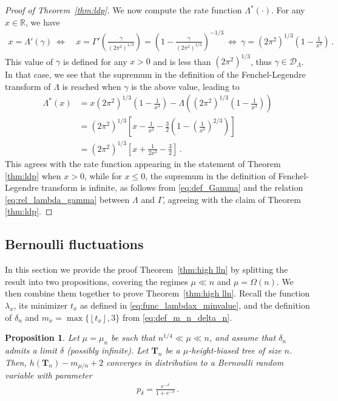 \documentclass{article}
\newcommand{\1}{\mathbbm{1}}								%
\newtheorem{proposition}[theorem]{Proposition}
\theoremstyle{definition}
\numberwithin{equation}{section}
\newcommand{\bT}{\mathbf T}
\newcommand{\cD}{\mathcal D}
\newcommand{\R}{\mathbb R}
\newcommand{\floor}[1]{\left\lfloor #1\right\rfloor}
\begin{document}
\begin{proof}[Proof of Theorem~\ref{thm:ldp}]
    We now compute the rate function $\Lambda^*(\cdot)$. For any $x\in\R$, we have
    \begin{align*}
        x=\Lambda'(\gamma)~\Longleftrightarrow&~x=\Gamma'\left(\frac{\gamma}{(2\pi^2)^{1/3}}\right)=\left(1-\frac{\gamma}{(2\pi^2)^{1/3}}\right)^{-1/3}~\Longleftrightarrow~\gamma=(2\pi^2)^{1/3}\left(1-\frac{1}{x^3}\right)\,.
    \end{align*}
    This value of $\gamma$ is defined for any $x>0$ and is less than $(2\pi^2)^{1/3}$, thus $\gamma \in \cD_\Lambda$.
    In that case, we see that the supremum in the definition of the Fenchel-Legendre transform of $\Lambda$ is reached when $\gamma$ is the above value, leading to
    \begin{align*}
        \Lambda^*(x)&=x(2\pi^2)^{1/3}\left(1-\frac{1}{x^3}\right)-\Lambda\left((2\pi^2)^{1/3}\left(1-\frac{1}{x^3}\right)\right)\\
        &=(2\pi^2)^{1/3}\left[x-\frac{1}{x^2}-\frac{3}{2}\left(1-\left(\frac{1}{x^3}\right)^{2/3}\right)\right]\\
        &=(2\pi^2)^{1/3}\left[x+\frac{1}{2x^2}-\frac{3}{2}\right]\,.
    \end{align*}
    This agrees with the rate function appearing in the statement of Theorem \ref{thm:ldp} when $x>0$, while for $x\leq 0$, the supremum in the definition of Fenchel-Legendre transform is infinite, as follows from \eqref{eq:def_Gamma} and the relation \eqref{eq:rel_lambda_gamma} between $\Lambda$ and $\Gamma$, agreeing with the claim of Theorem \ref{thm:ldp}.
\end{proof}

\subsection{Bernoulli fluctuations}\label{sec:bern}

In this section we provide the proof Theorem~\ref{thm:high lln} by splitting the result into two propositions, covering the regimes $\mu\ll n$ and $\mu=\Omega (  n)$.
We then combine them together to prove Theorem~\ref{thm:high lln}. {Recall the function $\lambda_x$, its minimizer $t_x$ as defined in \eqref{eq:func_lambdax_minvalue}, and the definition of $\delta_n$ and $m_x=\max\{\floor{t_x},3\}$ from \eqref{eq:def_m_n_delta_n}. }

\begin{proposition}\label{prop:inter ber}
    Let $\mu=\mu_n$ be such that $n^{1/4}\ll\mu\ll n$, and assume that $\delta_n$ admits a limit $\delta$ (possibly infinite).
    Let $\mathbf{T}_n$ be a $\mu$-height-biased tree of size $n$.
    Then, $h(\bT_n)-m_{\mu/n}+2$ converges in distribution to a Bernoulli random variable with parameter
    \begin{align*}
        p_\delta=\frac{e^{-\delta}}{1+e^{-\delta}}\,.
    \end{align*}
\end{proposition}
\end{document}
